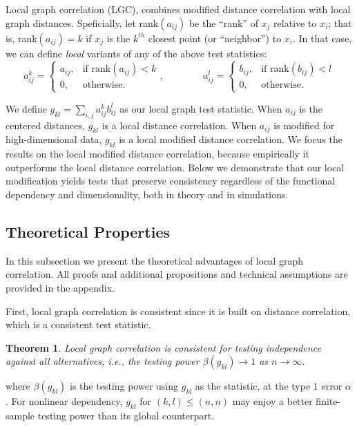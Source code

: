 \documentclass[11pt]{article}
\newtheorem{thm}{Theorem}
\begin{document}
 Local graph correlation (LGC), combines modified distance correlation with local graph distances.  Speficially, let rank$(a_{ij})$  be the ``rank'' of $x_j$ relative to $x_i$; that is, rank$(a_{ij})=k$ if $x_j$ is the $k^{th}$ closest point (or ``neighbor'') to $x_i$.  In that case, we can define \emph{local} variants of any of the above test statistics:
\begin{equation}
    a_{ij}^k=
    \begin{cases}
      a_{ij}, & \text{if rank}(a_{ij}) < k \\
      0, & \text{otherwise}.
    \end{cases}, \qquad \qquad
    a_{ij}^l=
    \begin{cases}
      b_{ij}, & \text{if rank}(b_{ij}) < l \\
      0, & \text{otherwise}.
    \end{cases}
\end{equation}

We define $g_{kl}=\sum_{i,j} a_{ij}^k b_{ij}^l$ as our local graph test statistic.  When $a_{ij}$ is the centered distances, $g_{kl}$ is a local  distance correlation.  When $a_{ij}$ is modified for high-dimensional data, $g_{kl}$ is a local modified distance correlation.  We focus the results on the local modified distance correlation, because empirically it outperforms the local distance correlation.  Below we demonstrate that our local modification yields tests that preserve consistency regardless of the functional dependency and dimensionality, both in theory and in simulations.






\subsection{Theoretical Properties}
\label{main4}
In this subsection we present the theoretical advantages of local graph correlation. All proofs and additional propositions and technical assumptions are provided in the appendix. 

First, local graph correlation is consistent since it is built on distance correlation, which is a consistent test statistic. 
\begin{thm}
\label{thm1}
Local graph correlation is consistent for testing independence against all alternatives, i.e., the testing power $\beta(g_{kl}) \rightarrow 1$ as $n \rightarrow \infty$. 
\end{thm}
where $\beta(g_{kl})$ is the testing power using $g_{kl}$ as the statistic, at the type $1$ error $\alpha$.
For nonlinear dependency, $g_{kl}$ for $(k,l) \leq (n,n)$ may enjoy a better finite-sample testing power than its global counterpart. 
\end{document}
